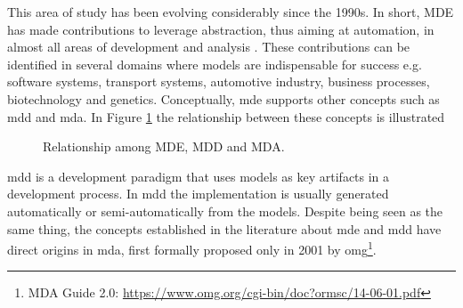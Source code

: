 This area of study has been evolving considerably since the 1990s.
In short, MDE has made contributions to leverage abstraction, thus aiming at automation, in almost all areas of development and analysis \cite{Bucchiarone:2020}.
These contributions can be identified in several domains where models are indispensable for success e.g. software systems, transport systems, automotive industry, business processes, biotechnology and genetics.
Conceptually, \ac{mde} supports other concepts such as \ac{mdd} and \ac{mda}. In Figure \ref{fig:MDE} the relationship between these concepts is illustrated

\begin{figure}[!htb]
    \centering
    \caption{Relationship among MDE, MDD and MDA.}
    
    \label{fig:MDE}
\end{figure}

\ac{mdd} is a development paradigm that uses models as key artifacts in a development process.
In \ac{mdd} the implementation is usually generated automatically or semi-automatically from the models.
Despite being seen as the same thing, the concepts established in the literature about \ac{mde} and \ac{mdd} have direct origins in \ac{mda}, first formally proposed only in 2001 by \ac{omg}\footnote{MDA Guide 2.0: \url{ https://www.omg.org/cgi-bin/doc?ormsc/14-06-01.pdf}}.

